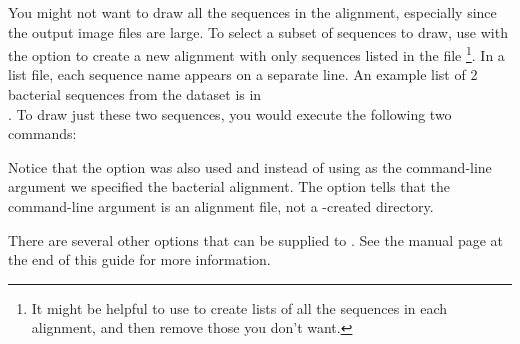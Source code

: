 You might not want to draw all the sequences in the alignment,
especially since the output image files are large. To select a subset
of sequences to draw, use  with the  
option to create a new alignment with only sequences listed in the
file 
\footnote{It might be helpful to use  to
create lists of all the sequences in each alignment, and then remove
those you don't want.}. 
In a list file, each sequence name appears on
a separate line. An example list of 2 bacterial sequences from
the  dataset is in \\ 
. To draw just
these two sequences, you would execute the following two commands:



Notice that the  option was also used and instead of using
 as the command-line argument we specified the bacterial
alignment. The  option tells  that the
command-line argument is an alignment file, not a
-created directory.

There are several other options that can be supplied to
. See the  manual page at the end of
this guide for more information.

